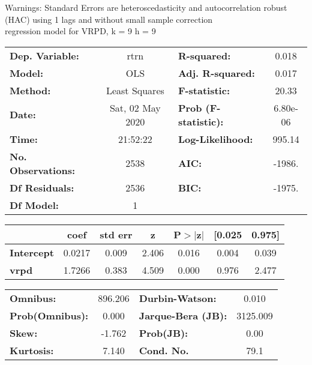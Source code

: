 Warnings: \newline
 [1] Standard Errors are heteroscedasticity and autocorrelation robust (HAC) using 1 lags and without small sample correction\\ 

regression model for VRPD, k = 9 h = 9\begin{center}
\begin{tabular}{lclc}
\toprule
\textbf{Dep. Variable:}    &       rtrn       & \textbf{  R-squared:         } &     0.018   \\
\textbf{Model:}            &       OLS        & \textbf{  Adj. R-squared:    } &     0.017   \\
\textbf{Method:}           &  Least Squares   & \textbf{  F-statistic:       } &     20.33   \\
\textbf{Date:}             & Sat, 02 May 2020 & \textbf{  Prob (F-statistic):} &  6.80e-06   \\
\textbf{Time:}             &     21:52:22     & \textbf{  Log-Likelihood:    } &    995.14   \\
\textbf{No. Observations:} &        2538      & \textbf{  AIC:               } &    -1986.   \\
\textbf{Df Residuals:}     &        2536      & \textbf{  BIC:               } &    -1975.   \\
\textbf{Df Model:}         &           1      & \textbf{                     } &             \\
\bottomrule
\end{tabular}
\begin{tabular}{lcccccc}
                   & \textbf{coef} & \textbf{std err} & \textbf{z} & \textbf{P$> |$z$|$} & \textbf{[0.025} & \textbf{0.975]}  \\
\midrule
\textbf{Intercept} &       0.0217  &        0.009     &     2.406  &         0.016        &        0.004    &        0.039     \\
\textbf{vrpd}      &       1.7266  &        0.383     &     4.509  &         0.000        &        0.976    &        2.477     \\
\bottomrule
\end{tabular}
\begin{tabular}{lclc}
\textbf{Omnibus:}       & 896.206 & \textbf{  Durbin-Watson:     } &    0.010  \\
\textbf{Prob(Omnibus):} &   0.000 & \textbf{  Jarque-Bera (JB):  } & 3125.009  \\
\textbf{Skew:}          &  -1.762 & \textbf{  Prob(JB):          } &     0.00  \\
\textbf{Kurtosis:}      &   7.140 & \textbf{  Cond. No.          } &     79.1  \\
\bottomrule
\end{tabular}
\end{center}


